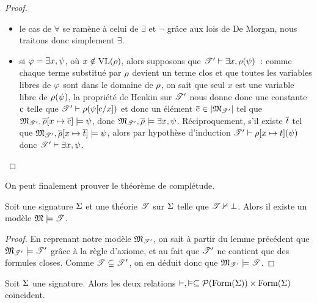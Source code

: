 \begin{proof}
\begin{itemize}
    se ramènent directement à $\mathord{\land}$ et $\mathord{\lnot}$
    grâce aux lois de De Morgan (sémantiquement on peut voir facilement
    l'équivalence par l'égalité des valeurs de vérité).
  \item le cas de $\mathord{\forall}$ se ramène à celui de $\mathord{\exists}$
    et $\mathord{\lnot}$ grâce
    aux lois de De Morgan, nous traitons donc simplement $\mathord{\exists}$.
  \item si $\varphi = \exists x, \psi$, où $x \notin \operatorname{VL}(\rho)$, alors
    supposons que $\mathscr T'\vdash \exists x, \rho(\psi)$~: comme chaque terme
    substitué par $\rho$ devient un terme clos et que toutes les variables
    libres de $\varphi$ sont dans le domaine de $\rho$, on sait que seul $x$ est
    une variable libre de $\rho(\psi)$, la propriété de Henkin sur $\mathscr T'$
    nous donne donc une constante $\mathrm{c}$ telle que
    $\mathscr T'\vdash \rho(\psi[\mathrm{c}/x])$
    et donc un élément $\overline{\mathrm{c}} \in \left\vert \mathfrak{M}_{\mathscr T'}\right\vert$ tel que
    $\mathfrak{M}_{\mathscr T'}, \overline{\rho}[x\mapsto \overline{\mathrm{c}}] \models \psi$,
    donc
    $\mathfrak{M}_{\mathscr T'},\overline{\rho}\models \exists x, \psi$.
    Réciproquement, s'il existe $\overline{t}$ tel que
    $\mathfrak{M}_{\mathscr T'},\overline{\rho}[x\mapsto \overline{t}]\models \psi$,
    alors par hypothèse d'induction
    $\mathscr T'\vdash \rho[x\mapsto t](\psi)$ donc
    $\mathscr T'\vdash \exists x, \psi$.\qedhere
  \end{itemize}
\end{proof}

\noindent
On peut finalement prouver le théorème de complétude.

\begin{theorem}
  Soit une signature $\Sigma$ et une théorie $\mathscr T$ sur $\Sigma$ telle que
  $\mathscr T\nvdash\bot$. Alors il existe un modèle $\mathfrak{M}\models \mathscr T$.
\end{theorem}

\begin{proof}
  En reprenant notre modèle $\mathfrak{M}_{\mathscr T'}$, on sait à partir du lemme
  précédent que $\mathfrak{M}_{\mathscr T'}\models \mathscr T'$ grâce à la règle
  d'axiome, et au fait que $\mathscr T'$ ne contient que des formules closes.
  Comme $\mathscr T\subseteq\mathscr T'$, on en déduit donc que
  $\mathfrak{M}_{\mathscr T'}\models \mathscr T$.
\end{proof}

\begin{theorem}\label{thm.completude}
  Soit $\Sigma$ une signature. Alors les deux relations
  $\vdash,\vDash\subseteq \mathcal{P}(\operatorname{Form}(\Sigma))\times\operatorname{Form}(\Sigma)$
  coïncident.
\end{theorem}

